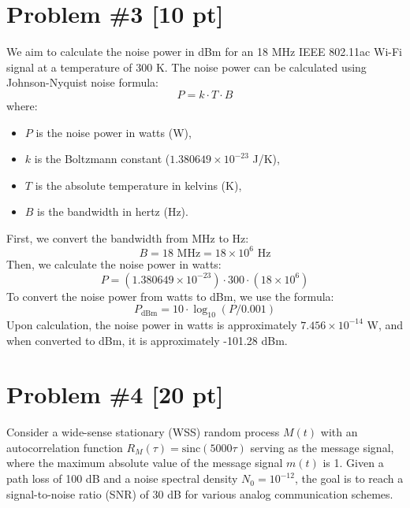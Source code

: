 \documentclass{article}
\begin{document}
\section*{Problem \#3 [10 pt]}

We aim to calculate the noise power in dBm for an 18 MHz IEEE 802.11ac Wi-Fi signal at a temperature of 300 K.
\newline\newline
The noise power can be calculated using Johnson-Nyquist noise formula:
\[ P = k \cdot T \cdot B \]
where:
\begin{itemize}
    \item \( P \) is the noise power in watts (W),
    \item \( k \) is the Boltzmann constant (\( 1.380649 \times 10^{-23} \) J/K),
    \item \( T \) is the absolute temperature in kelvins (K),
    \item \( B \) is the bandwidth in hertz (Hz).
\end{itemize}
\noindent
First, we convert the bandwidth from MHz to Hz:
\[ B = 18 \text{ MHz} = 18 \times 10^6 \text{ Hz} \]
\noindent
Then, we calculate the noise power in watts:
\[ P = (1.380649 \times 10^{-23}) \cdot 300 \cdot (18 \times 10^6) \]
\noindent
To convert the noise power from watts to dBm, we use the formula:
\[ P_{\text{dBm}} = 10 \cdot \log_{10}(P / 0.001) \]
\noindent
Upon calculation, the noise power in watts is approximately \( 7.456 \times 10^{-14} \) W, and when converted to dBm, it is approximately -101.28 dBm.
\newpage


\section*{Problem \#4 [20 pt]}
Consider a wide-sense stationary (WSS) random process \( M(t) \) with an autocorrelation function \( R_M(\tau) = \text{sinc}(5000\tau) \) serving as the message signal, where the maximum absolute value of the message signal \( m(t) \) is 1. Given a path loss of 100 dB and a noise spectral density \( N_0 = 10^{-12} \), the goal is to reach a signal-to-noise ratio (SNR) of 30 dB for various analog communication schemes. 
\end{document}
